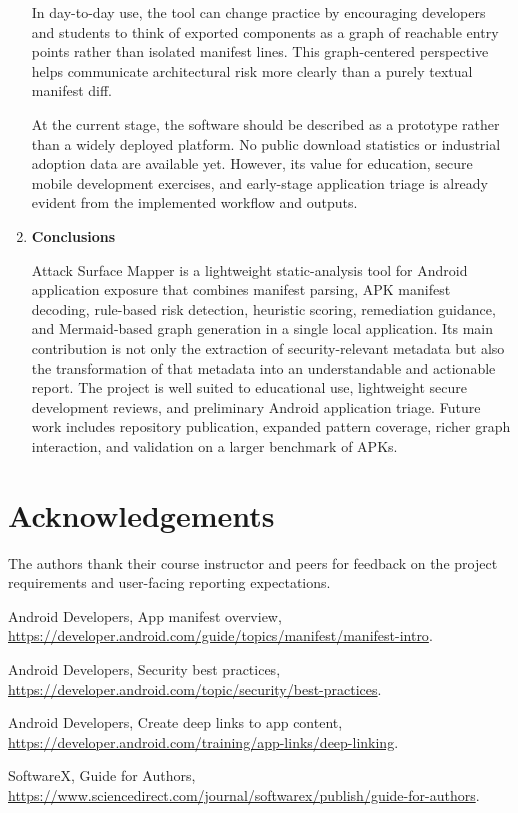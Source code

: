 \documentclass[preprint,12pt,a4paper]{elsarticle}
\begin{document}
\begin{enumerate}
In day-to-day use, the tool can change practice by encouraging developers and students to think of exported components as a graph of reachable entry points rather than isolated manifest lines. This graph-centered perspective helps communicate architectural risk more clearly than a purely textual manifest diff.

At the current stage, the software should be described as a prototype rather than a widely deployed platform. No public download statistics or industrial adoption data are available yet. However, its value for education, secure mobile development exercises, and early-stage application triage is already evident from the implemented workflow and outputs.

\item \textbf{Conclusions}

Attack Surface Mapper is a lightweight static-analysis tool for Android application exposure that combines manifest parsing, APK manifest decoding, rule-based risk detection, heuristic scoring, remediation guidance, and Mermaid-based graph generation in a single local application. Its main contribution is not only the extraction of security-relevant metadata but also the transformation of that metadata into an understandable and actionable report. The project is well suited to educational use, lightweight secure development reviews, and preliminary Android application triage. Future work includes repository publication, expanded pattern coverage, richer graph interaction, and validation on a larger benchmark of APKs.

\end{enumerate}

\section*{Acknowledgements}

The authors thank their course instructor and peers for feedback on the project requirements and user-facing reporting expectations.

\begin{thebibliography}{00}

Android Developers, App manifest overview, \url{https://developer.android.com/guide/topics/manifest/manifest-intro}.

Android Developers, Security best practices, \url{https://developer.android.com/topic/security/best-practices}.

Android Developers, Create deep links to app content, \url{https://developer.android.com/training/app-links/deep-linking}.

SoftwareX, Guide for Authors, \url{https://www.sciencedirect.com/journal/softwarex/publish/guide-for-authors}.

\end{thebibliography}
\end{document}
